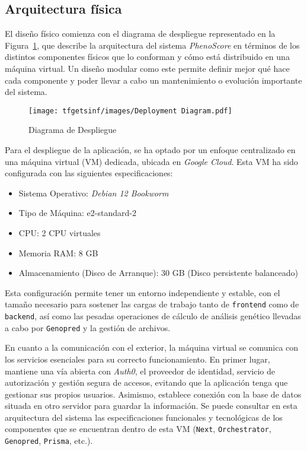 \subsection{Arquitectura física}

El diseño físico comienza con el diagrama de despliegue representado en la Figura~\ref{fig:despliegue}, que describe la arquitectura del sistema \textit{PhenoScore} en términos de los distintos componentes físicos que lo conforman y cómo está distribuido en una máquina virtual. Un diseño modular como este permite definir mejor qué hace cada componente y poder llevar a cabo un mantenimiento o evolución importante del sistema. 

\begin{figure}[H]
    \centering
    \texttt{[image: tfgetsinf/images/Deployment Diagram.pdf]}
    \caption{Diagrama de Despliegue}
    \label{fig:despliegue}
\end{figure}

Para el despliegue de la aplicación, se ha optado por un enfoque centralizado en una máquina virtual (VM) dedicada, ubicada en \textit{Google Cloud}. Esta VM ha sido configurada con las siguientes especificaciones: 

\begin{itemize}
    \item Sistema Operativo: \textit{Debian 12 Bookworm}
    \item Tipo de Máquina: e2-standard-2
    \item CPU: 2 CPU virtuales
    \item Memoria RAM: 8 GB
    \item Almacenamiento (Disco de Arranque): 30 GB (Disco persistente balanceado)
\end{itemize}

Esta configuración permite tener un entorno independiente y estable, con el tamaño necesario para sostener las cargas de trabajo tanto de \texttt{frontend} como de \texttt{backend}, así como las pesadas operaciones de cálculo de análisis genético llevadas a cabo por \texttt{Genopred} y la gestión de archivos.

En cuanto a la comunicación con el exterior, la máquina virtual se comunica con los servicios esenciales para su correcto funcionamiento. En primer lugar, mantiene una vía abierta con \textit{Auth0}, el proveedor de identidad, servicio de autorización y gestión segura de accesos, evitando que la aplicación tenga que gestionar sus propios usuarios. Asimismo, establece conexión con la base de datos situada en otro servidor para guardar la información. Se puede consultar en esta arquitectura del sistema las especificaciones funcionales y tecnológicas de los componentes que se encuentran dentro de esta VM (\texttt{Next}, \texttt{Orchestrator}, \texttt{Genopred}, \texttt{Prisma}, etc.).

